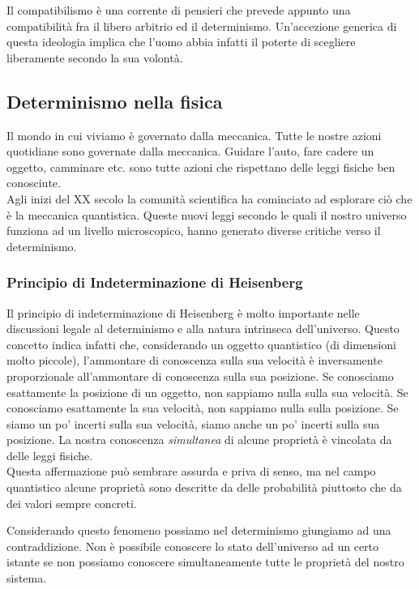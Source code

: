 \documentclass{article}
\begin{document}
Il compatibilismo è una corrente di pensieri che prevede appunto una compatibilità
fra il libero arbitrio ed il determinismo. Un'accezione generica di questa ideologia
implica che l'uomo abbia infatti il poterte di scegliere liberamente secondo la sua volontà.

\subsection{Determinismo nella fisica}

Il mondo in cui viviamo è governato dalla meccanica.
Tutte le nostre azioni quotidiane sono governate dalla meccanica.
Guidare l'auto, fare cadere un oggetto, camminare etc. sono tutte azioni
che rispettano delle leggi fisiche ben conosciute. \\
Agli inizi del XX secolo la comunità scientifica ha cominciato ad esplorare ciò che
è la meccanica quantistica. Queste nuovi leggi secondo le quali il nostro universo funziona
ad un livello microscopico, hanno generato diverse critiche verso il determinismo.

\subsubsection{Principio di Indeterminazione di Heisenberg}

Il principio di indeterminazione di Heisenberg è molto importante nelle discussioni
legale al determinismo e alla natura intrinseca dell'universo.
Questo concetto indica infatti che, considerando un oggetto quantistico (di dimensioni molto piccole),
l'ammontare di conoscenza sulla sua velocità è inversamente proporzionale all'ammontare
di conoscenza sulla sua posizione.
Se conosciamo esattamente la posizione di un oggetto, non sappiamo nulla sulla sua velocità.
Se conosciamo esattamente la sua velocità, non sappiamo nulla sulla posizione. Se siamo un po'
incerti sulla sua velocità, siamo anche un po' incerti sulla sua posizione.
La nostra conoscenza \textit{simultanea} di alcune proprietà è vincolata da delle leggi fisiche. \\
Questa affermazione può sembrare assurda e priva di senso, ma nel campo quantistico
alcune proprietà sono descritte da delle probabilità piuttosto che da dei valori sempre concreti.

Considerando questo fenomeno possiamo nel determinismo giungiamo ad una contraddizione.
Non è possibile conoscere lo stato dell'universo ad un certo istante se non possiamo
conoscere simultaneamente tutte le proprietà del nostro sistema.
\end{document}
